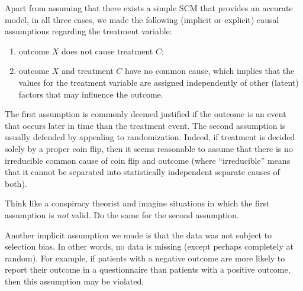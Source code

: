 Apart from assuming that there exists a simple SCM that provides an accurate model,
in all three cases, we made the following (implicit or explicit) causal assumptions regarding 
the treatment variable:
\begin{enumerate}
  \item outcome $X$ does not cause treatment $C$;
  \item outcome $X$ and treatment $C$ have no common cause, which implies that the values for
   the treatment variable are assigned independently of other (latent) factors that may influence
   the outcome.
\end{enumerate}
The first assumption is commonly deemed justified if the outcome is an event that occurs later in time than the treatment event.
The second assumption is usually defended by appealing to randomization.
Indeed, if treatment is decided solely by a proper coin flip, 
then it seems reasonable to assume that there is no irreducible common cause of coin 
flip and outcome (where ``irreducible'' means that it cannot be separated into 
statistically independent separate causes of both).
\begin{Exc}
  Think like a conspiracy theorist and imagine situations in which the first
  assumption is \emph{not} valid. Do the same for the second assumption.
\end{Exc}

Another implicit assumption we made is that the data was not subject to selection 
bias. In other words, no data is missing (except perhaps completely at random). 
For example, if patients with a negative outcome are more likely to report their
outcome in a questionnaire than patients with a positive outcome,
then this assumption may be violated.

